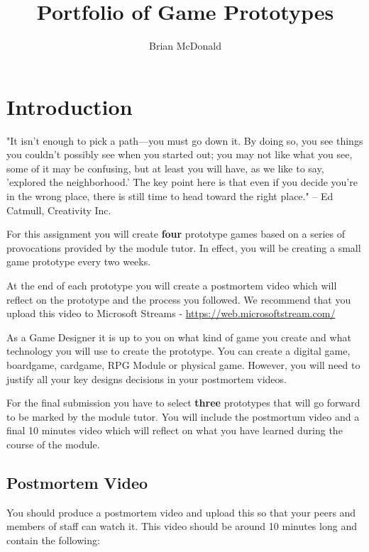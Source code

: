 \documentclass{../../fal_assignment}
\title{Portfolio of Game Prototypes}
\author{Brian McDonald}
\begin{document}
\maketitle

\section*{Introduction}

\begin{marginquote}
"It isn't enough to pick a path—you must go down it. By doing so, you see things you couldn't possibly see when you started out; you may not like what you see, some of it may be confusing, but at least you will have, as we like to say, 'explored the neighborhood.' The key point here is that even if you decide you're in the wrong place, there is still time to head toward the right place."
-- Ed Catmull, Creativity Inc.

\end{marginquote}
For this assignment you will create \textbf{four} prototype games based on a series of provocations provided by the module tutor. In effect, you will be creating a small game prototype every two weeks. 

At the end of each prototype you will create a postmortem video which will reflect on the prototype and the process you followed. We recommend that you upload this video to Microsoft Streams - \url{https://web.microsoftstream.com/}

As a Game Designer it is up to you on what kind of game you create and what technology you will use to create the prototype. You can create a digital game, boardgame, cardgame, RPG Module or physical game. However, you will need to justify all your key designs decisions in your postmortem videos.

For the final submission you have to select \textbf{three} prototypes that will go forward to be marked by the module tutor. You will include the postmortum video and a final 10 minutes video which will reflect on what you have learned during the course of the module.

\subsection*{Postmortem Video}
You should produce a postmortem video and upload this so that your peers and members of staff can watch it. This video should be around 10 minutes long and contain the following:
\end{document}
